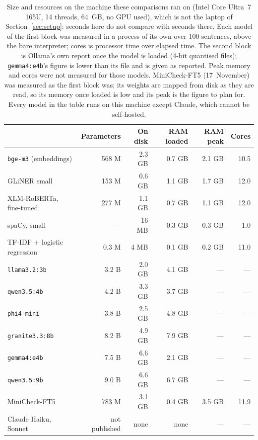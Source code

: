 \begin{table}[ht]
\centering
\small
\begin{tabular}{@{}lrrrrr@{}}
\toprule
 & Parameters & On disk & RAM loaded & RAM peak & Cores \\
\midrule
\texttt{bge-m3} (embeddings) & 568 M & 2.3 GB & 0.7 GB & 2.1 GB & 10.5 \\
GLiNER small & 153 M & 0.6 GB & 1.1 GB & 1.7 GB & 12.0 \\
XLM-RoBERTa, fine-tuned & 277 M & 1.1 GB & 0.7 GB & 1.1 GB & 12.0 \\
spaCy, small & --- & 16 MB & 0.3 GB & 0.3 GB & 1.0 \\
TF-IDF + logistic regression & 0.3 M & 4 MB & 0.1 GB & 0.2 GB & 11.0 \\
\midrule
\texttt{llama3.2:3b} & 3.2 B & 2.0 GB & 4.1 GB & --- & --- \\
\texttt{qwen3.5:4b} & 4.2 B & 3.3 GB & 3.7 GB & --- & --- \\
\texttt{phi4-mini} & 3.8 B & 2.5 GB & 4.8 GB & --- & --- \\
\texttt{granite3.3:8b} & 8.2 B & 4.9 GB & 7.9 GB & --- & --- \\
\texttt{gemma4:e4b} & 7.5 B & 6.6 GB & 2.1 GB & --- & --- \\
\texttt{qwen3.5:9b} & 9.0 B & 6.6 GB & 6.7 GB & --- & --- \\
\midrule
MiniCheck-FT5 & 783 M & 3.1 GB & 0.4 GB & 3.5 GB & 11.9 \\
\midrule
Claude Haiku, Sonnet & not published & none & none & --- & --- \\
\bottomrule
\end{tabular}
\caption[What each model needs]{Size and resources on the machine these
comparisons ran on (Intel Core Ultra~7 165U, 14 threads, 64~GB, no GPU
used), which is not the laptop of Section~\ref{sec:setup}: seconds here
do not compare with seconds there. Each model of
the first block was measured in a process of its own over 100 sentences,
above the bare interpreter; cores is processor time over elapsed time.
The second block is Ollama's own report once the model is loaded
(4-bit quantised files); \texttt{gemma4:e4b}'s figure is lower than its
file and is given as reported. Peak memory and cores were not measured
for those models. MiniCheck-FT5 (17~November) was measured as the first
block was; its weights are mapped from disk as they are read, so its
memory once loaded is low and its peak is the figure to plan for. Every
model in the table runs on this machine except Claude, which cannot be
self-hosted.}
\label{tab:frameworks-resources}
\end{table}

